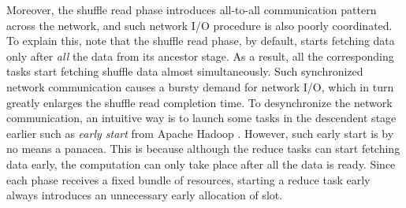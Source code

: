 Moreover, the shuffle read phase introduces all-to-all communication pattern across the network, and such network I/O procedure is also poorly coordinated.
To explain this, note that the shuffle read phase, by default, starts fetching data only after \emph{all} the data from its ancestor stage. As a result, all the corresponding tasks start fetching shuffle data almost simultaneously.
Such synchronized network communication causes a bursty demand for network I/O, which in turn greatly enlarges the shuffle read completion time. To desynchronize the network communication, an intuitive way is to launch some tasks in the descendent stage earlier such as \textit{early start} from Apache Hadoop \cite{hadoop}. However, such early start is by no means a panacea. This is because although the reduce tasks can start fetching data early, the computation can only take place after all the data is ready. Since each phase receives a fixed bundle of resources, starting a reduce task early always introduces an unnecessary early allocation of slot. 


